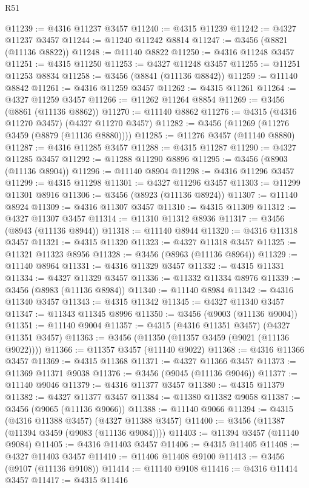 \begin{lexlean}{R51}
\begin{coremodule}
@11239 := @4316 @11237 @3457
@11240 := @4315 @11239
@11242 := @4327 @11237 @3457
@11244 := @11240 @11242 @8814
@11247 := @3456 (@8821 (@11136 @8822))
@11248 := @11140 @8822
@11250 := @4316 @11248 @3457
@11251 := @4315 @11250
@11253 := @4327 @11248 @3457
@11255 := @11251 @11253 @8834
@11258 := @3456 (@8841 (@11136 @8842))
@11259 := @11140 @8842
@11261 := @4316 @11259 @3457
@11262 := @4315 @11261
@11264 := @4327 @11259 @3457
@11266 := @11262 @11264 @8854
@11269 := @3456 (@8861 (@11136 @8862))
@11270 := @11140 @8862
@11276 := @4315 (@4316 @11270 @3457) (@4327 @11270 @3457)
@11282 := @3456 (@11269 (@11276 @3459 (@8879 (@11136 @8880))))
@11285 := @11276 @3457 (@11140 @8880)
@11287 := @4316 @11285 @3457
@11288 := @4315 @11287
@11290 := @4327 @11285 @3457
@11292 := @11288 @11290 @8896
@11295 := @3456 (@8903 (@11136 @8904))
@11296 := @11140 @8904
@11298 := @4316 @11296 @3457
@11299 := @4315 @11298
@11301 := @4327 @11296 @3457
@11303 := @11299 @11301 @8916
@11306 := @3456 (@8923 (@11136 @8924))
@11307 := @11140 @8924
@11309 := @4316 @11307 @3457
@11310 := @4315 @11309
@11312 := @4327 @11307 @3457
@11314 := @11310 @11312 @8936
@11317 := @3456 (@8943 (@11136 @8944))
@11318 := @11140 @8944
@11320 := @4316 @11318 @3457
@11321 := @4315 @11320
@11323 := @4327 @11318 @3457
@11325 := @11321 @11323 @8956
@11328 := @3456 (@8963 (@11136 @8964))
@11329 := @11140 @8964
@11331 := @4316 @11329 @3457
@11332 := @4315 @11331
@11334 := @4327 @11329 @3457
@11336 := @11332 @11334 @8976
@11339 := @3456 (@8983 (@11136 @8984))
@11340 := @11140 @8984
@11342 := @4316 @11340 @3457
@11343 := @4315 @11342
@11345 := @4327 @11340 @3457
@11347 := @11343 @11345 @8996
@11350 := @3456 (@9003 (@11136 @9004))
@11351 := @11140 @9004
@11357 := @4315 (@4316 @11351 @3457) (@4327 @11351 @3457)
@11363 := @3456 (@11350 (@11357 @3459 (@9021 (@11136 @9022))))
@11366 := @11357 @3457 (@11140 @9022)
@11368 := @4316 @11366 @3457
@11369 := @4315 @11368
@11371 := @4327 @11366 @3457
@11373 := @11369 @11371 @9038
@11376 := @3456 (@9045 (@11136 @9046))
@11377 := @11140 @9046
@11379 := @4316 @11377 @3457
@11380 := @4315 @11379
@11382 := @4327 @11377 @3457
@11384 := @11380 @11382 @9058
@11387 := @3456 (@9065 (@11136 @9066))
@11388 := @11140 @9066
@11394 := @4315 (@4316 @11388 @3457) (@4327 @11388 @3457)
@11400 := @3456 (@11387 (@11394 @3459 (@9083 (@11136 @9084))))
@11403 := @11394 @3457 (@11140 @9084)
@11405 := @4316 @11403 @3457
@11406 := @4315 @11405
@11408 := @4327 @11403 @3457
@11410 := @11406 @11408 @9100
@11413 := @3456 (@9107 (@11136 @9108))
@11414 := @11140 @9108
@11416 := @4316 @11414 @3457
@11417 := @4315 @11416

\end{coremodule}
\end{lexlean}
